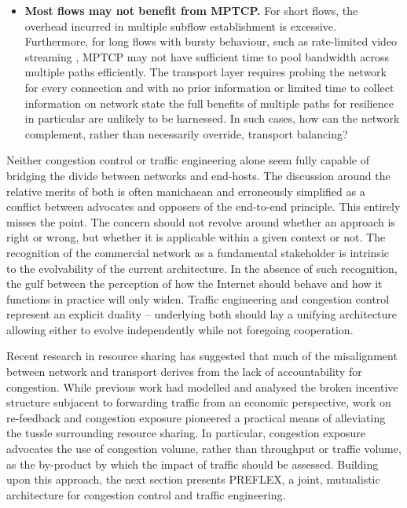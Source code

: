 \begin{itemize}
\item{
    \textbf{Most flows may not benefit from \ac{MPTCP}.}
    For short flows, the overhead incurred in multiple subflow establishment is excessive.
    Furthermore, for long flows with bursty behaviour, such as rate-limited video streaming \cite{Rao:2011p547}, \ac{MPTCP} may not have sufficient time to pool bandwidth across multiple paths efficiently.
    The transport layer requires probing the network for every connection and with no prior information or limited time to collect information on network state the full benefits of multiple paths for resilience in particular are unlikely to be harnessed.
    In such cases, how can the network complement, rather than necessarily override, transport balancing?
}


\end{itemize}

Neither congestion control or traffic engineering alone seem fully capable of bridging the divide between networks and end-hosts. 
The discussion around the relative merits of both is often manichaean and erroneously simplified as a conflict between advocates and opposers of the end-to-end principle. 
This entirely misses the point. 
The concern should not revolve around whether an approach is right or wrong, but whether it is applicable within a given context or not. 
The recognition of the commercial network as a fundamental stakeholder is intrinsic to the evolvability of the current architecture. 
In the absence of such recognition, the gulf between the perception of how the Internet should behave and how it functions in practice will only widen. 
Traffic engineering and congestion control represent an explicit duality -- underlying both should lay a unifying architecture allowing either to evolve independently while not foregoing cooperation.

Recent research in resource sharing has suggested that much of the misalignment between network and transport derives from the lack of accountability for congestion.
While previous work had modelled and analysed the broken incentive structure subjacent to forwarding traffic from an economic perspective, work on re-feedback and congestion exposure \cite{Briscoe:2005p346} pioneered a practical means of alleviating the tussle surrounding resource sharing.  
In particular, congestion exposure advocates the use of congestion volume, rather than throughput or traffic volume, as the by-product by which the impact of traffic should be assessed.  
Building upon this approach, the next section presents PREFLEX, a joint, mutualistic architecture for congestion control and traffic engineering. 

